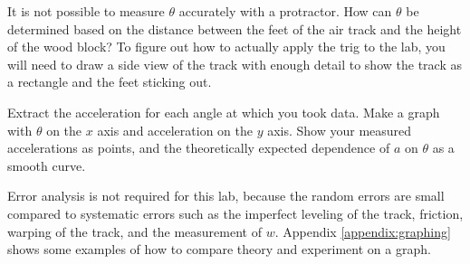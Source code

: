 \prelabquestion  It is not possible to measure $\theta $ accurately with
a protractor.  How can $\theta $ be determined based on the
distance between the feet of the air track and the
height of the wood block? To figure out how to actually apply the trig to the
lab, you will need to draw a side view of the track with enough detail to
show the track as a rectangle and the feet sticking out.

\analysis

Extract the acceleration for each angle at which you took
data.  Make a graph with $\theta $ on the $x$ axis and
acceleration on the $y$ axis.  Show your measured accelerations
as points, and the theoretically expected dependence of $a$
on $\theta $ as a smooth curve.

Error analysis is not required for this lab, because the
random errors are small compared to systematic errors such
as the imperfect leveling of the track, friction,
warping of the track, and the measurement of $w$.
Appendix \ref{appendix:graphing} shows some examples of how
to compare theory and experiment on a graph.

